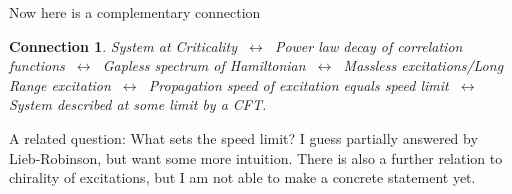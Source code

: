 \documentclass{article}
\newtheorem{conn}{Connection}
\begin{document}
Now here is a complementary connection
\begin{conn}
    System at Criticality 
    $~\longleftrightarrow~$ Power law decay of correlation functions
    $~\longleftrightarrow~$ Gapless spectrum of Hamiltonian
    $~\longleftrightarrow~$ Massless excitations/Long Range excitation
    $~\longleftrightarrow~$ Propagation speed of excitation equals speed limit
    $~\longleftrightarrow~$ System described at some limit by a CFT.
\end{conn}
A related question: What sets the speed limit? I guess partially answered by Lieb-Robinson, but want some more intuition. There is also a further relation to chirality of excitations, but I am not able to make a concrete statement yet.


\end{document}
